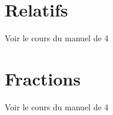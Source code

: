 \section{Relatifs}

Voir le cours du manuel de 4

\section{Fractions}

Voir le cours du manuel de 4
